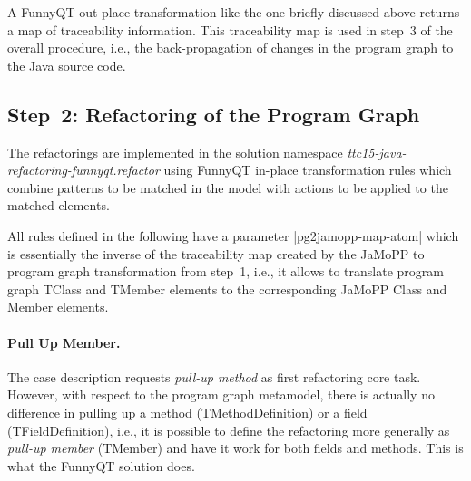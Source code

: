 \documentclass[submission]{eptcs}
\newcommand{\code}{\clojureinline}
\begin{document}
A FunnyQT out-place transformation like the one briefly discussed above returns
a map of traceability information.  This traceability map is used in step~3 of
the overall procedure, i.e., the back-propagation of changes in the program
graph to the Java source code.


\subsection{Step~2: Refactoring of the Program Graph}
\label{sec:step-2:refactoring-pg}

The refactorings are implemented in the solution namespace
\emph{ttc15-java-refactoring-funnyqt.refactor} using FunnyQT in-place
transformation rules which combine patterns to be matched in the model with
actions to be applied to the matched elements.

All rules defined in the following have a parameter \code|pg2jamopp-map-atom|
which is essentially the inverse of the traceability map created by the JaMoPP
to program graph transformation from step~1, i.e., it allows to translate
program graph \textsf{TClass} and \textsf{TMember} elements to the
corresponding JaMoPP \textsf{Class} and \textsf{Member} elements.

\paragraph{Pull Up Member.}

The case description requests \emph{pull-up method} as first refactoring core
task.  However, with respect to the program graph metamodel, there is actually
no difference in pulling up a method (\textsf{TMethodDefinition}) or a field
(\textsf{TFieldDefinition}), i.e., it is possible to define the refactoring
more generally as \emph{pull-up member} (\textsf{TMember}) and have it work for
both fields and methods.  This is what the FunnyQT solution does.
\end{document}
